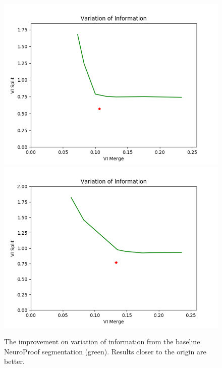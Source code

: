 \begin{figure}[t!]
	\centering
	\includegraphics[width=0.42\linewidth]{./figures/variation_of_information-train.png}
	\hspace{0.085\linewidth}
	\includegraphics[width=0.42\linewidth]{./figures/variation_of_information-test.png}
	\caption{The improvement on variation of information from the baseline NeuroProof segmentation (green). Results closer to the origin are better.}
	\label{fig:variation-of-information}
\end{figure}